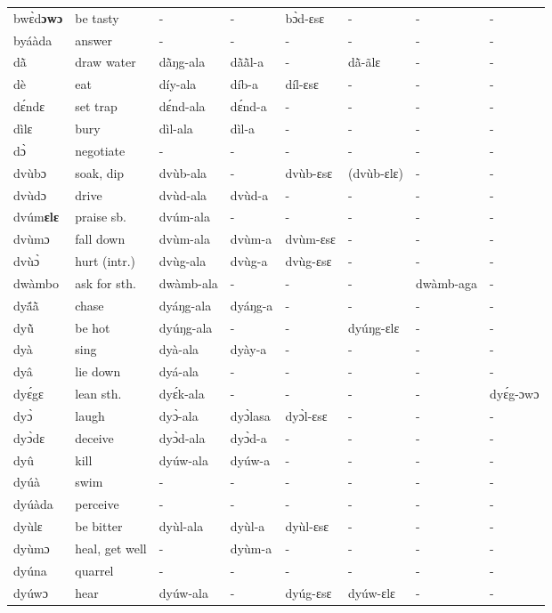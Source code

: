 \begin{sidewaystable}
\begin{longtable}{lp{3.5cm}llllll}
bwɛ̀d{\bfseries ɔwɔ} & be tasty & - & -  & bɔ̀d-ɛsɛ  & - & - & - \\
byáàda & answer & - & - & - & - & - & - \\
dã̀ & draw water & dã̀ŋg-ala & dã̀ã̀l-a & - & dã̀-ãlɛ & - & - \\
dè & eat & díy-ala & díb-a & díl-ɛsɛ & - & - & - \\
dɛ́ndɛ & set trap & dɛ́nd-ala & dɛ́nd-a & - & - & - & - \\
dìlɛ & bury & dìl-ala & dìl-a & - & - & - & - \\
dɔ̀ & negotiate & - & - & - & - & - & -  \\
dvùbɔ & soak, dip & dvùb-ala & - & dvùb-ɛsɛ & (dvùb-ɛlɛ) & - & - \\
dvùdɔ & drive & dvùd-ala & dvùd-a & - & - & - & - \\
dvúm{\bfseries ɛlɛ} & praise sb. & dvúm-ala & - & - & - & - & - \\
dvùmɔ & fall down & dvùm-ala & dvùm-a & dvùm-ɛsɛ & - & - & - \\
dvùɔ̀ & hurt (intr.)  & dvùg-ala & dvùg-a & dvùg-ɛsɛ  & - & - & - \\
dwàmbo & ask for sth. & dwàmb-ala & - & - & - & dwàmb-aga & - \\
dyã́ã̀ & chase & dyáŋg-ala & dyáŋg-a & - & - & - & - \\
dyũ̀ & be hot & dyúŋg-ala & - & - &  dyúŋg-ɛlɛ & -  & - \\
dyà & sing &  dyà-ala & dyày-a & - & - & - & - \\
dyâ & lie down & dyá-ala & - & - & - & - & - \\
dyɛ́gɛ & lean sth. & dyɛ́k-ala & - & - & - & - & dyɛ́g-ɔwɔ \\
dyɔ̀ & laugh & dyɔ̀-ala & dyɔ̀lasa & dyɔ̀l-ɛsɛ & - & - & - \\
dyɔ̀dɛ & deceive & dyɔ̀d-ala & dyɔ̀d-a & - & - & - & - \\
dyû & kill & dyúw-ala & dyúw-a & - & - & - & - \\
dyúà & swim & - & - & - & - & - & - \\
dyúàda & perceive & - & - & - &  - & - & - \\
dyùlɛ & be bitter & dyùl-ala & dyùl-a & dyùl-ɛsɛ & - & - & - \\
dyùmɔ & heal, get well & - & dyùm-a & - & - & - & - \\
dyúna & quarrel & - & - & - & - & -  & - \\
dyúwɔ & hear & dyúw-ala & - & dyúg-ɛsɛ & dyúw-ɛlɛ & - & - \\

\end{longtable}
\end{sidewaystable}
